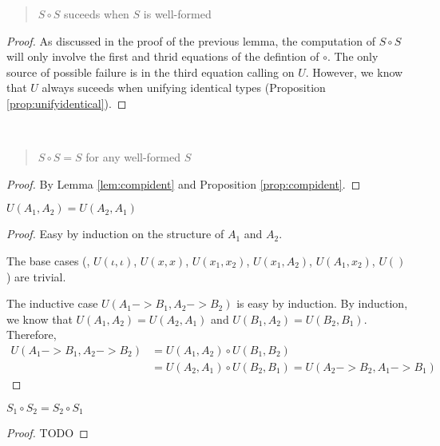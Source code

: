 \begin{proposition}
	\label{prop:compident}
\begin{quote} $S \circ S$ suceeds when $S$ is well-formed \end{quote}
\end{proposition}
\begin{proof}
As discussed in the proof of the previous lemma,
the computation of $S \circ S$ will only involve
the first and thrid equations of the defintion of $\circ$.
The only source of possible failure is in the third equation calling on $U$.
However, we know that $U$ always suceeds when unifying identical types
(Proposition \ref{prop:unifyidentical}).
\end{proof}

\begin{theorem} ~
	\begin{quote} $S\circ S = S$ for any well-formed $S$ \end{quote}
\end{theorem}
\begin{proof}
	By Lemma \ref{lem:compident} and Proposition \ref{prop:compident}.
\end{proof}

\begin{theorem} $ U(A_1,A_2) = U(A_2,A_1) $
	\label{thm:commU}
\end{theorem}
\begin{proof} Easy by induction on the structure of $A_1$ and $A_2$.

The base cases (\ie, $U(\iota,\iota)$, $U(x,x)$, $U(x_1,x_2)$,
			$U(x_1,A_2)$, $U(A_1,x_2)$, $U()$) are trivial.

The inductive case $U(A_1 -> B_1, A_2 -> B_2)$ is easy by induction.
By induction, we know that $U(A_1,A_2) = U(A_2,A_1)$ and
$U(B_1,A_2) = U(B_2,B_1)$. Therefore,
\begin{align*}
U(A_1 -> B_1, A_2 -> B_2)
	&= U(A_1,A_2) \circ U(B_1,B_2) \\
	&= U(A_2,A_1) \circ U(B_2,B_1) = U(A_2 -> B_2, A_1 -> B_1)
\end{align*}
\end{proof}

\begin{theorem}
	$ S_1\circ S_2 = S_2\circ S_1 $
\end{theorem}
\begin{proof} TODO
\end{proof}


